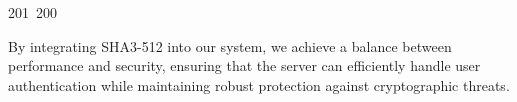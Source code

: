 201~200~\documentclass{article}
\begin{document}
	                                                                                                                                                                                                                                                                                                	                                                                                                                                        	    	                                                                                                	                                                                                                                                                                                                                                                                                                                                	                                                                        	                                                                        	                                                                                                                                        	                                                                                                                                By integrating SHA3-512 into our system, we achieve a balance between performance and security, ensuring that the server can efficiently handle user authentication while maintaining robust protection against cryptographic threats.

	                                                                                                                                                                                                                                                                                                	                                                                                                                                        	    	                                                                                                	                                                                                                                                                                                                                                                                                                                                	                                                                        	                                                                        	                                                                                                                                        	                                                                                                                                \clearpage
\end{document}
